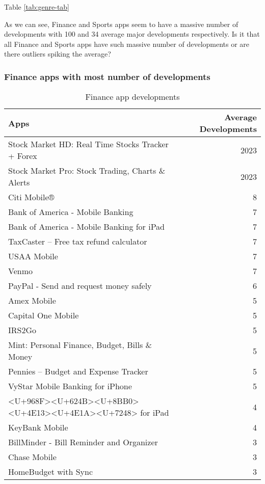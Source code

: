 \documentclass[
]{article}
\begin{document}
Table \ref{tab:genre-tab}

As we can see, Finance and Sports apps seem to have a massive number of developments with 100 and 34 average major developments respectively. Is it that all Finance and Sports apps have such massive number of developments or are there outliers spiking the average?

\hypertarget{finance-apps-with-most-number-of-developments}{%
\subsubsection{Finance apps with most number of developments}\label{finance-apps-with-most-number-of-developments}}

\begin{table}[!h]

\caption{\label{tab:finance-tab}Finance app developments}
\centering
\begin{tabular}[t]{l|r}
\hline
Apps & Average Developments\\
\hline
\rowcolor{gray!6}  Stock Market HD: Real Time Stocks Tracker + Forex & 2023\\
\hline
Stock Market Pro: Stock Trading, Charts \& Alerts & 2023\\
\hline
\rowcolor{gray!6}  Citi Mobile® & 8\\
\hline
Bank of America - Mobile Banking & 7\\
\hline
\rowcolor{gray!6}  Bank of America - Mobile Banking for iPad & 7\\
\hline
TaxCaster – Free tax refund calculator & 7\\
\hline
\rowcolor{gray!6}  USAA Mobile & 7\\
\hline
Venmo & 7\\
\hline
\rowcolor{gray!6}  PayPal - Send and request money safely & 6\\
\hline
Amex Mobile & 5\\
\hline
\rowcolor{gray!6}  Capital One Mobile & 5\\
\hline
IRS2Go & 5\\
\hline
\rowcolor{gray!6}  Mint: Personal Finance, Budget, Bills \& Money & 5\\
\hline
Pennies – Budget and Expense Tracker & 5\\
\hline
\rowcolor{gray!6}  VyStar Mobile Banking for iPhone & 5\\
\hline
<U+968F><U+624B><U+8BB0><U+4E13><U+4E1A><U+7248> for  iPad & 4\\
\hline
\rowcolor{gray!6}  KeyBank Mobile & 4\\
\hline
BillMinder - Bill Reminder and Organizer & 3\\
\hline
\rowcolor{gray!6}  Chase Mobile & 3\\
\hline
HomeBudget with Sync & 3\\
\hline
\end{tabular}
\end{table}
\end{document}
